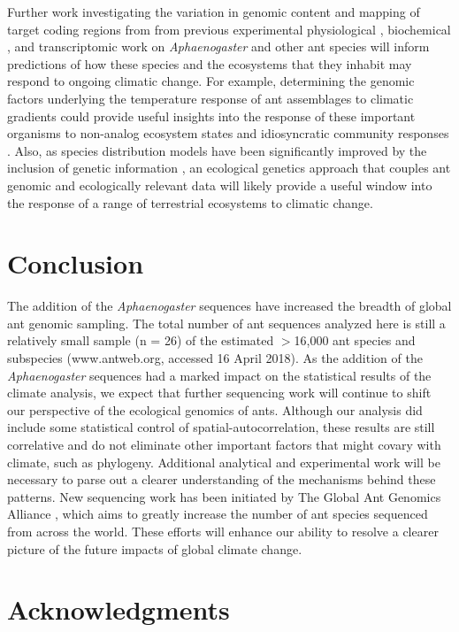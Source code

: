 \documentclass[fleqn,10pt,lineno]{wlpeerj} %
\begin{document}
Further work investigating the variation in genomic content and
mapping of target coding regions from from previous experimental
physiological \citep{Nguyen2017}, biochemical \citep{HelmsCahan2017},
and transcriptomic \citep{Stanton-Geddes} work on
\textit{Aphaenogaster} and other ant species will inform predictions
of how these species and the ecosystems that they inhabit may respond
to ongoing climatic change. For example, determining the genomic
factors underlying the temperature response of ant assemblages to
climatic gradients \citep{Warren2013, Diamond2016, Diamond2017} could
provide useful insights into the response of these important organisms
to non-analog ecosystem states and idiosyncratic community responses
\citep{Bewick2014a}. Also, as species distribution models have been
significantly improved by the inclusion of genetic information
\citep{Ikeda2016}, an ecological genetics approach that couples ant
genomic and ecologically relevant data will likely provide a useful
window into the response of a range of terrestrial ecosystems to
climatic change.


\section*{Conclusion}

The addition of the \textit{Aphaenogaster} sequences have increased
the breadth of global ant genomic sampling. The total number of ant
sequences analyzed here is still a relatively small sample (n = 26) of
the estimated $>$16,000 ant species and subspecies (www.antweb.org,
accessed 16 April 2018). As the addition of the \textit{Aphaenogaster}
sequences had a marked impact on the statistical results of the
climate analysis, we expect that further sequencing work will continue
to shift our perspective of the ecological genomics of ants. Although
our analysis did include some statistical control of
spatial-autocorrelation, these results are still correlative and do
not eliminate other important factors that might covary with climate,
such as phylogeny. Additional analytical and experimental work will be
necessary to parse out a clearer understanding of the mechanisms
behind these patterns. New sequencing work has been initiated by The
Global Ant Genomics Alliance \citep{Boomsma2017}, which aims to
greatly increase the number of ant species sequenced from across the
world. These efforts will enhance our ability to resolve a clearer
picture of the future impacts of global climate change.

\section*{Acknowledgments}
\end{document}
